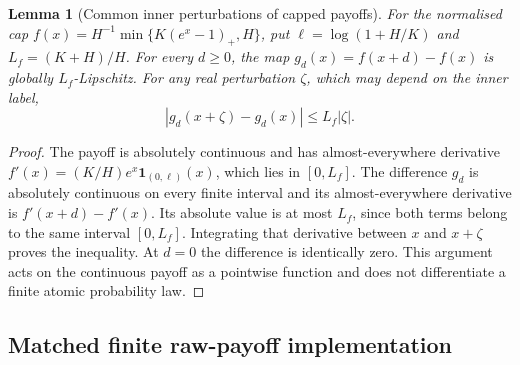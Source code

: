 \documentclass[11pt]{article}
\newtheorem{lemma}[theorem]{Lemma}
\begin{document}
\begin{lemma}[Common inner perturbations of capped payoffs]
\label{lem:common-information-inner-payoff}
For the normalised cap
$f(x)=H^{-1}\min\{K(e^x-1)_+,H\}$, put
$\ell=\log(1+H/K)$ and $L_f=(K+H)/H$. For every $d\geq0$, the map
$g_d(x)=f(x+d)-f(x)$ is globally $L_f$-Lipschitz. For any real
perturbation $\zeta$, which may depend on the inner label,
\begin{equation}
 |g_d(x+\zeta)-g_d(x)|\leq L_f|\zeta|.
 \label{eq:common-information-inner-payoff}
\end{equation}
\end{lemma}
\begin{proof}
The payoff is absolutely continuous and has almost-everywhere derivative
$f'(x)=(K/H)e^x\mathbf1_{(0,\ell)}(x)$, which lies in $[0,L_f]$.
The difference $g_d$ is absolutely continuous on every finite interval
and its almost-everywhere derivative is $f'(x+d)-f'(x)$.
Its absolute value is at most $L_f$, since both terms belong to the same
interval $[0,L_f]$. Integrating that derivative between $x$ and $x+\zeta$
proves the inequality. At $d=0$ the difference is identically zero.
This argument acts on the continuous payoff as a pointwise function and
does not differentiate a finite atomic probability law.
\end{proof}

\subsection{Matched finite raw-payoff implementation}
\end{document}
